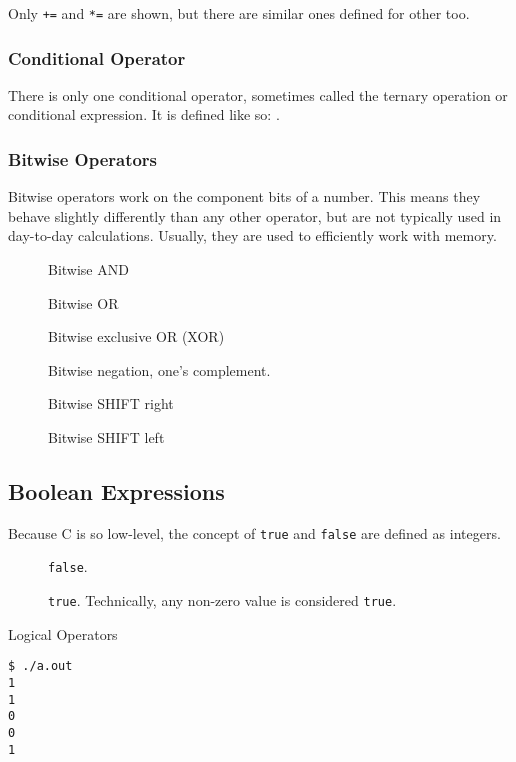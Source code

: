 Only \texttt{+=} and \texttt{*=} are shown, but there are similar ones defined for other  too.

\subsubsection{Conditional Operator}\label{subsubsec:Conditional_Operator}
There is only one conditional operator, sometimes called the ternary operation or conditional expression.
It is defined like so: .

\subsubsection{Bitwise Operators}\label{subsubsec:Bitwise_Operators}
Bitwise operators work on the component bits of a number.
This means they behave slightly differently than any other operator, but are not typically used in day-to-day calculations.
Usually, they are used to efficiently work with memory.

\begin{description}
\item[\cinline{&}] Bitwise AND
\item[\cinline{|}] Bitwise OR
\item[\cinline{^}] Bitwise exclusive OR (XOR)
\item[\cinline{~}] Bitwise negation, one's complement.
\item[\cinline{>>}] Bitwise SHIFT right
\item[\cinline{<<}] Bitwise SHIFT left
\end{description}

\subsection{Boolean Expressions}\label{subsec:Boolean_Expressions}
Because C is so low-level, the concept of \texttt{true} and \texttt{false} are defined as integers.

\begin{description}
\item[] \texttt{false}.
\item[] \texttt{true}.
  Technically, any non-zero value is considered \texttt{true}.
\end{description}

\begin{listing}[h!tbp]
\caption{Logical Operators}
\label{lst:Logical_Operators}
\begin{verbatim}
$ ./a.out
1
1
0
0
1
\end{verbatim}
\end{listing}

